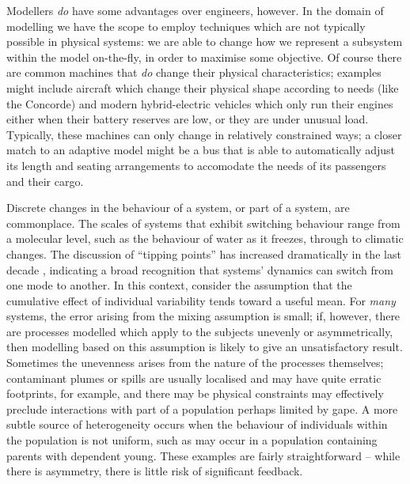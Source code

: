Modellers \emph{do} have some advantages over engineers,
however. In the domain of modelling we have the scope to employ
techniques which are not typically possible in physical systems: we
are able to change how we represent a subsystem within the model
on-the-fly, in order to maximise some objective.  Of course there
are common machines that \emph{do} change their physical
characteristics; examples might include aircraft which change their
physical shape according to needs (like the Concorde) and modern
hybrid-electric vehicles which only run their engines either when
their battery reserves are low, or they are under unusual
load. Typically, these machines can only change in relatively
constrained ways; a closer match to an adaptive model might be a bus
that is able to automatically adjust its length and seating
arrangements to accomodate the needs of its passengers and their
cargo.

Discrete changes in the behaviour of a system, or part of a system,
are commonplace. The scales of systems that exhibit switching
behaviour range from a molecular level, such as the behaviour of water
as it freezes, through to climatic changes.  The discussion of
``tipping points'' has increased dramatically in the last decade
\cite{bhatanacharoentipping}, indicating a broad recognition that
systems' dynamics can switch from one mode to another.  In this
context, consider the assumption that the cumulative effect of
individual variability tends toward a useful mean.  For \emph{many}
systems, the error arising from the mixing assumption is small;
if, however, there are processes modelled which apply to the subjects
unevenly or asymmetrically, then modelling based on this assumption is
likely to give an unsatisfactory result.  Sometimes the unevenness
arises from the nature of the processes themselves; contaminant plumes
or spills are usually localised and may have quite erratic footprints,
for example, and there may be physical constraints may effectively
preclude interactions with part of a population perhaps limited by
gape.  A more subtle source of heterogeneity occurs when the behaviour
of individuals within the population is not uniform, such as may occur
in a population containing parents with dependent young. These
examples are fairly straightforward -- while there is asymmetry, there
is little risk of significant feedback.

